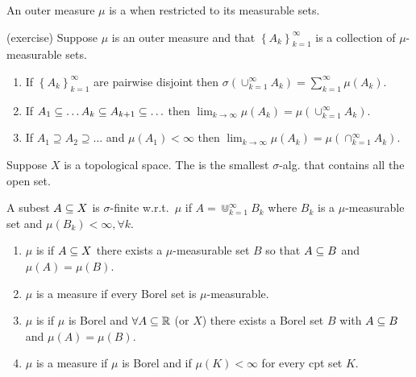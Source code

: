 \begin{defn}
  An outer measure $\mu$ is a  when restricted to its
  measurable sets.
\end{defn}

\begin{thm}(exercise)
  Suppose $\mu$ is an outer measure and that $\left\{ A_k
  \right\}_{k=1}^\infty$ is a collection of $\mu$-measurable sets.
  \begin{enumerate}
    \item If $\left\{ A_k\right\}_{k=1}^\infty$ are pairwise disjoint then
      $\sigma\left( \cup_{k=1}^\infty A_k \right) =
      \sum_{k=1}^\infty\mu(A_k)$.
    \item If $A_1 \subseteq \ldots A_k\subseteq A_{k+1} \subseteq \ldots$ then
      $\lim_{k\to \infty}\mu(A_k) = \mu\left( \cup_{k=1}^\infty A_k
      \right)$.
    \item If $A_1 \supseteq A_2 \supseteq \ldots$ and $\mu(A_1) < \infty$ then
      $\lim_{k\to \infty}\mu(A_k) = \mu(\cap_{k=1}^\infty A_k)$.
  \end{enumerate}
\end{thm}

\begin{defn}
  Suppose $X$ is a topological space. The  is the smallest $\sigma$-alg. that contains all the
  open set.
\end{defn}

\begin{defn}
  A subest $A\subseteq X$ is $\sigma$-finite w.r.t.\ $\mu$ if
  $A=\Cup_{k=1}^\infty B_k$ where $B_k$ is a $\mu$-measurable set and
  $\mu(B_k)<\infty, \forall k$.
\end{defn}

\begin{defn}
  \begin{enumerate}
    \item $\mu$ is  if \forall $A\subseteq X$ there exists a
      $\mu$-measurable set $B$ so that $A\subseteq B$ and $\mu(A) = \mu(B)$.
    \item $\mu$ is a  measure if every Borel set is
      $\mu$-measurable.
    \item $\mu$ is  if $\mu$ is Borel and
      $\forall A\subseteq \mathbb{R}$ (or $X$) there exists a Borel set
      $B$ with $A\subseteq B$ and $\mu(A)=\mu(B)$.
    \item $\mu$ is a  measure if $\mu$ is Borel and if
      $\mu(K)<\infty$ for every cpt set $K$.
  \end{enumerate}
\end{defn}

